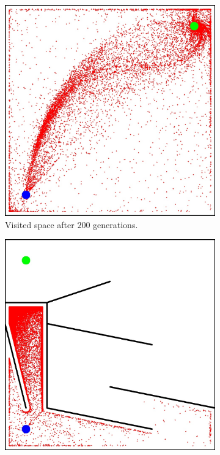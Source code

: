 \begin{figure}[t!]
\centering
\begin{subfigure}[b]{0.3\textwidth}
\includegraphics[width=1.0\textwidth]{../Figures/Misc/MazeEasyFitness.jpg}
\caption{Visited space after $200$ generations.}
\label{fig:mazeFitnessEasy}
\end{subfigure}\hspace{2cm}
\begin{subfigure}[b]{0.3\textwidth}
\includegraphics[width=1.0\textwidth]{../Figures/Misc/MazeHardFitness.jpg}

\end{subfigure}
\end{figure}
